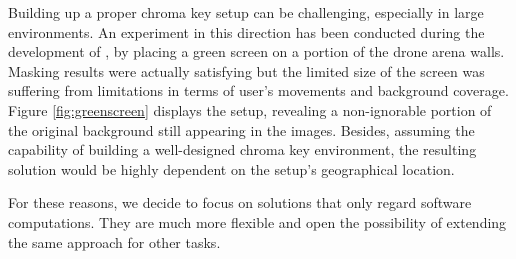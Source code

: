Building up a proper chroma key setup can be challenging, especially in large environments. An experiment in this direction has been conducted during the development of \cite{mantegazza2019visionbased}, by placing a green screen on a portion of the drone arena walls. Masking results were actually satisfying but the limited size of the screen was suffering from limitations in terms of user's movements and background coverage. Figure \ref{fig:greenscreen} displays the setup, revealing a non-ignorable portion of the original background still appearing in the images. Besides, assuming the capability of building a well-designed chroma key environment, the resulting solution would be highly dependent on the setup's geographical location.

For these reasons, we decide to focus on solutions that only regard software computations. They are much more flexible and open the possibility of extending the same approach for other tasks.

